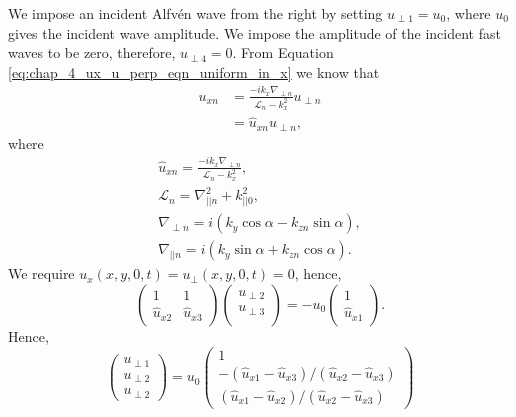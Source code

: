 We impose an incident Alfv\'en wave from the right by setting $u_{\perp1}=u_0$, where $u_0$ gives the incident wave amplitude. We impose the amplitude of the incident fast waves to be zero, therefore, $u_{\perp4}=0$.  From Equation \eqref{eq:chap_4_ux_u_perp_eqn_uniform_in_x} we know that
\begin{equation}
    \label{eq:uxn_oblique_field_uniform_density}
    \begin{aligned}
    u_{x n} &= \frac{-ik_x\nabla_{\perp n}}{\mathcal{L}_{n}-k_x^2}u_{\perp n} \\
    &= \hat{u}_{x n}u_{\perp n},
\end{aligned}
\end{equation}
where
\begin{gather}
    \hat{u}_{x n} = \frac{-ik_x\nabla_{\perp n}}{\mathcal{L}_{n}-k_x^2}, \\
    \mathcal{L}_{n}=\nabla_{||n}^2+k_{||0}^2, \\
    \nabla_{\perp n} = i(k_y\cos\alpha - k_{zn}\sin\alpha), \\
    \nabla_{||n} = i(k_y\sin\alpha+k_{zn}\cos\alpha).
\end{gather}
We require $u_x(x,y,0,t)=u_\perp(x,y,0,t)=0$, hence,
\begin{equation}
\begin{pmatrix}
1 & 1 \\
\hat{u}_{x2} & \hat{u}_{x3}
\end{pmatrix}
\begin{pmatrix}
u_{\perp 2} \\
u_{\perp 3} \\
\end{pmatrix}
=
-u_0
\begin{pmatrix}
1 \\
\hat{u}_{x1}
\end{pmatrix}.
\end{equation}
Hence,
\begin{equation}
    \label{eq:u_perp_n_oblique_field_uniform_density}
    \begin{pmatrix}
    u_{\perp 1} \\
    u_{\perp 2} \\
    u_{\perp 2}
    \end{pmatrix}
    = u_0
    \begin{pmatrix}
    1 \\
    -(\hat{u}_{x1}-\hat{u}_{x3})/(\hat{u}_{x2}-\hat{u}_{x3}) \\
    (\hat{u}_{x1}-\hat{u}_{x2})/(\hat{u}_{x2}-\hat{u}_{x3})
    \end{pmatrix}
\end{equation}
